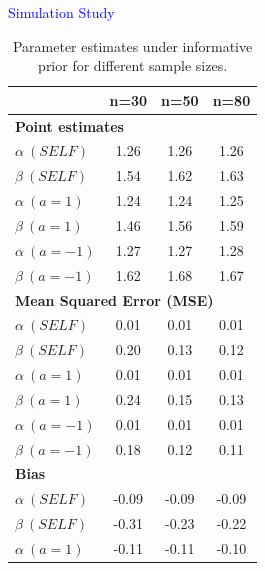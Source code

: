 \documentclass[final]{beamer}
\newlength{\colwidth}
\begin{document}
\begin{frame}[t]
\begin{columns}[t]
\begin{column}{\colwidth}
\begin{block}{\textcolor{blue}{Simulation Study}}
{\small
\begin{table}[h!]
    \centering
    \caption{Parameter estimates under informative prior for different sample sizes.}
    \label{tab:results}
    \begin{tabular}{lccc}
        \toprule
            & \textbf{n=30} & \textbf{n=50} & \textbf{n=80} \\
        \midrule
        \multicolumn{4}{l}{\textbf{Point estimates}} \\
        $\alpha \ (SELF)$               & 1.26          & 1.26          & 1.26          \\
        $\beta \ (SELF)$                & 1.54          & 1.62          & 1.63          \\
        $\alpha \ (a=1)$       & 1.24          & 1.24          & 1.25          \\
        $\beta \ (a=1)$        & 1.46          & 1.56          & 1.59          \\
        $\alpha \ (a=-1)$      & 1.27          & 1.27          & 1.28          \\
        $\beta \ (a=-1)$       & 1.62          & 1.68          & 1.67          \\
        \midrule
        \multicolumn{4}{l}{\textbf{Mean Squared Error (MSE)}} \\
        $\alpha \ (SELF) $               & 0.01          & 0.01          & 0.01          \\
        $\beta \ (SELF) $                & 0.20          & 0.13          & 0.12          \\
        $\alpha \ (a=1)$       & 0.01          & 0.01          & 0.01          \\
        $\beta \ (a=1)$        & 0.24          & 0.15          & 0.13          \\
        $\alpha \ (a=-1)$      & 0.01          & 0.01          & 0.01          \\
        $\beta \ (a=-1)$       & 0.18          & 0.12          & 0.11          \\
        \midrule
        \multicolumn{4}{l}{\textbf{Bias}} \\
        $\alpha \ (SELF)$               & -0.09         & -0.09         & -0.09         \\
        $\beta \ (SELF)$                & -0.31         & -0.23         & -0.22         \\
        $\alpha \ (a=1)$       & -0.11         & -0.11         & -0.10         \\

\end{tabular}
\end{table}}
\end{block}
\end{column}
\end{columns}
\end{frame}
\end{document}
